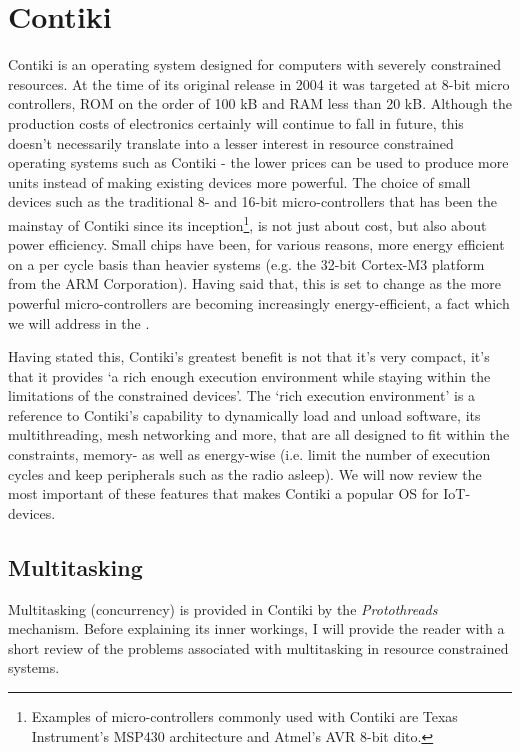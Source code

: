 \documentclass[final,a4paper,twoside,11pt,onecolumn]{report}
\begin{document}
\section{Contiki}
Contiki is an operating system designed for computers with severely constrained resources\cite{dunkels04contiki}. At the time of its original release in 2004 it was targeted at 8-bit micro controllers, ROM on the order of 100 kB and RAM less than 20 kB\citep[1]{dunkels04contiki}. Although the production costs of electronics certainly will continue to fall in future, this doesn't necessarily translate into a lesser interest in resource constrained operating systems such as Contiki - the lower prices can be used to produce more units instead of making existing devices more powerful. The choice of small devices such as the traditional 8- and 16-bit micro-controllers that has been the mainstay of Contiki since its inception\footnote{Examples of micro-controllers commonly used with Contiki are Texas Instrument's MSP430 architecture and Atmel's AVR 8-bit dito.}, is not just about cost, but also about power efficiency. Small chips have been, for various reasons, more energy efficient on a per cycle basis than heavier systems (e.g. the 32-bit  Cortex-M3 platform from the ARM Corporation). Having said that, this is set to change as the more powerful micro-controllers are becoming increasingly energy-efficient, a fact which we will address in the .

Having stated this, Contiki's greatest benefit is not that it's very compact, it's that it provides `a rich enough execution environment while staying within the limitations of the constrained devices'\citep[Introduction]{dunkels04contiki}. The `rich execution environment' is a reference to Contiki's capability to dynamically load and unload software, its multithreading, mesh networking\cite{tsiftes10rpl} and more, that are all designed to fit within the constraints, memory- as well as energy-wise (i.e. limit the number of execution cycles and keep peripherals such as the radio asleep). We will now review the most important of these features that makes Contiki a popular OS for IoT-devices.

\subsection{Multitasking}
Multitasking (concurrency) is provided in Contiki by the \emph{Protothreads} mechanism\cite{dunkels2005protothreads}. Before explaining its inner workings, I will provide the reader with a short review of the problems associated with multitasking in resource constrained systems.
\end{document}
